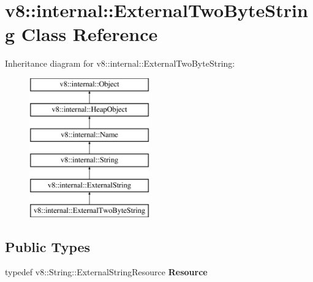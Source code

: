 \hypertarget{classv8_1_1internal_1_1_external_two_byte_string}{}\section{v8\+:\+:internal\+:\+:External\+Two\+Byte\+String Class Reference}
\label{classv8_1_1internal_1_1_external_two_byte_string}
Inheritance diagram for v8\+:\+:internal\+:\+:External\+Two\+Byte\+String\+:\begin{figure}[H]
\begin{center}
\leavevmode
\includegraphics[height=6.000000cm]{classv8_1_1internal_1_1_external_two_byte_string}
\end{center}
\end{figure}
\subsection*{Public Types}
\begin{DoxyCompactItemize}
\item 
\hypertarget{classv8_1_1internal_1_1_external_two_byte_string_a5a74ee8539e114d51940dc69c742880b}{}typedef v8\+::\+String\+::\+External\+String\+Resource {\bfseries Resource}\label{classv8_1_1internal_1_1_external_two_byte_string_a5a74ee8539e114d51940dc69c742880b}

\end{DoxyCompactItemize}
